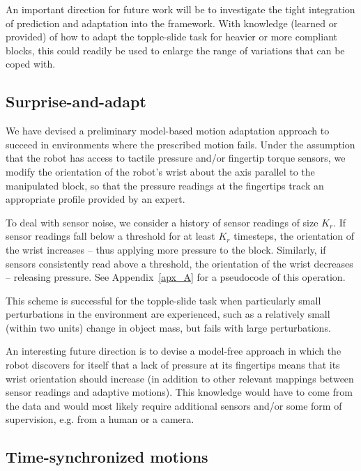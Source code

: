 An important direction for future work will be to investigate the tight integration of prediction and adaptation into the framework.  
With knowledge (learned or provided) of how to adapt the topple-slide task for heavier or more compliant blocks, this could readily be used to enlarge the range of variations that can be coped with. 

\subsection*{Surprise-and-adapt}
We have devised a preliminary model-based motion adaptation approach to succeed in environments where the prescribed motion fails.
Under the assumption that the robot has access to tactile pressure and/or fingertip torque sensors, we modify the orientation of the robot's wrist about the axis parallel to the manipulated block, so that the pressure readings at the fingertips track an appropriate profile provided by an expert.

To deal with sensor noise, we consider a history of sensor readings of size $K_r$.
If sensor readings fall below a threshold for at least $K_r$ timesteps, the orientation of the wrist increases -- thus applying more pressure to the block.
Similarly, if sensors consistently read above a threshold, the orientation of the wrist decreases -- releasing pressure.
See Appendix~\ref{apx_A} for a pseudocode of this operation.

This scheme is successful for the topple-slide task when particularly small perturbations in the environment are experienced, such as a relatively small (within two units) change in object mass, but fails with large perturbations.%

An interesting future direction is to devise a model-free approach in which the robot discovers for itself that a lack of pressure at its fingertips means that its wrist orientation should increase (in addition to other relevant mappings between sensor readings and adaptive motions).
This knowledge would have to come from the data and would most likely require additional sensors and/or some form of supervision, e.g. from a human or a camera.



\subsection*{Time-synchronized motions}


